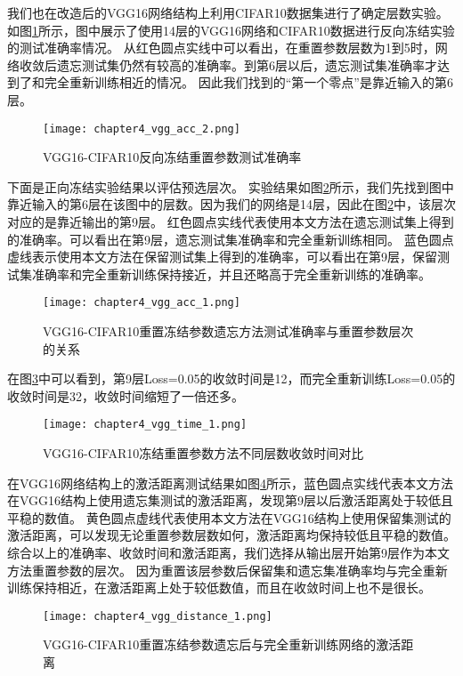 我们也在改造后的VGG16网络结构上利用CIFAR10数据集进行了确定层数实验。
如图\ref{fig:chapter4_vgg_acc_2}所示，图中展示了使用14层的VGG16网络和CIFAR10数据进行反向冻结实验的测试准确率情况。
从红色圆点实线中可以看出，在重置参数层数为1到5时，网络收敛后遗忘测试集仍然有较高的准确率。到第6层以后，遗忘测试集准确率才达到了和完全重新训练相近的情况。
因此我们找到的“第一个零点”是靠近输入的第6层。
\begin{figure}
    \centering
    \texttt{[image: chapter4\_vgg\_acc\_2.png]}
    \caption{VGG16-CIFAR10反向冻结重置参数测试准确率}
    \label{fig:chapter4_vgg_acc_2}
\end{figure}

下面是正向冻结实验结果以评估预选层次。
实验结果如图\ref{fig:chapter4_vgg_acc_1}所示，我们先找到图中靠近输入的第6层在该图中的层数。因为我们的网络是14层，因此在图\ref{fig:chapter4_vgg_acc_1}中，该层次对应的是靠近输出的第9层。
红色圆点实线代表使用本文方法在遗忘测试集上得到的准确率。可以看出在第9层，遗忘测试集准确率和完全重新训练相同。
蓝色圆点虚线表示使用本文方法在保留测试集上得到的准确率，可以看出在第9层，保留测试集准确率和完全重新训练保持接近，并且还略高于完全重新训练的准确率。

\begin{figure}
    \centering
    \texttt{[image: chapter4\_vgg\_acc\_1.png]}
    \caption{VGG16-CIFAR10重置冻结参数遗忘方法测试准确率与重置参数层次的关系}
    \label{fig:chapter4_vgg_acc_1}
\end{figure}

在图\ref{fig:chapter4_vgg_time_1}中可以看到，第9层Loss=0.05的收敛时间是12，而完全重新训练Loss=0.05的收敛时间是32，收敛时间缩短了一倍还多。
\begin{figure}
    \centering
    \texttt{[image: chapter4\_vgg\_time\_1.png]}
    \caption{VGG16-CIFAR10冻结重置参数方法不同层数收敛时间对比}
    \label{fig:chapter4_vgg_time_1}
\end{figure}

在VGG16网络结构上的激活距离测试结果如图\ref{fig:chapter4_vgg_distance_1}所示，蓝色圆点实线代表本文方法在VGG16结构上使用遗忘集测试的激活距离，发现第9层以后激活距离处于较低且平稳的数值。
黄色圆点虚线代表使用本文方法在VGG16结构上使用保留集测试的激活距离，可以发现无论重置参数层数如何，激活距离均保持较低且平稳的数值。综合以上的准确率、收敛时间和激活距离，我们选择从输出层开始第9层作为本文方法重置参数的层次。
因为重置该层参数后保留集和遗忘集准确率均与完全重新训练保持相近，在激活距离上处于较低数值，而且在收敛时间上也不是很长。
\begin{figure}
    \centering
    \texttt{[image: chapter4\_vgg\_distance\_1.png]}
    \caption{VGG16-CIFAR10重置冻结参数遗忘后与完全重新训练网络的激活距离}
    \label{fig:chapter4_vgg_distance_1}
\end{figure}

